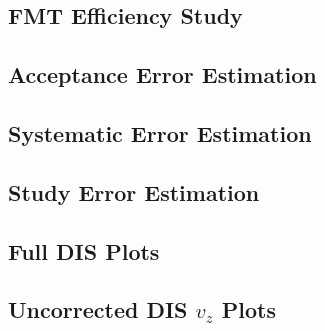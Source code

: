 \subsection*{FMT Efficiency Study}


\subsection*{Acceptance Error Estimation}


\subsection*{Systematic Error Estimation}


\subsection*{Study Error Estimation}


\subsection*{Full DIS Plots}


\subsection*{Uncorrected DIS $v_z$ Plots}

